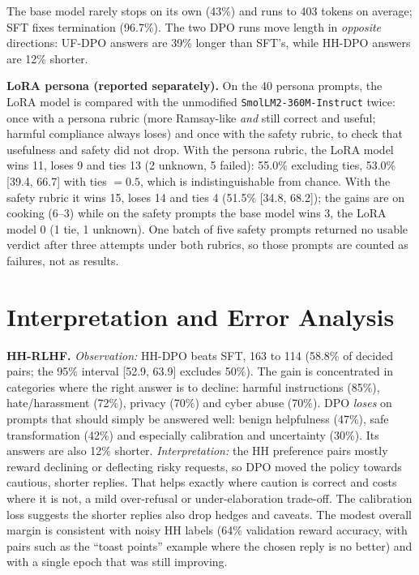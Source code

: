 \documentclass[10pt]{article}
\begin{document}
The base model rarely stops on its own (43\%) and runs to 403 tokens on average; SFT fixes
termination (96.7\%). The two DPO runs move length in \emph{opposite} directions: UF-DPO answers are
39\% longer than SFT's, while HH-DPO answers are 12\% shorter.

\textbf{LoRA persona (reported separately).} On the 40 persona prompts, the LoRA model is compared
with the unmodified \texttt{SmolLM2-360M-Instruct} twice: once with a persona rubric (more
Ramsay-like \emph{and} still correct and useful; harmful compliance always loses) and once with the
safety rubric, to check that usefulness and safety did not drop.
With the persona rubric, the LoRA model wins 11, loses 9 and ties 13 (2 unknown, 5 failed):
55.0\% excluding ties, 53.0\% [39.4, 66.7] with ties $=0.5$, which is indistinguishable from chance.
With the safety rubric it wins 15, loses 14 and ties 4 (51.5\% [34.8, 68.2]); the gains are on
cooking (6--3) while on the safety prompts the base model wins 3, the LoRA model 0 (1 tie,
1 unknown). One batch of five safety prompts returned no usable verdict after three attempts under both
rubrics, so those prompts are counted as failures, not as results.

\section{Interpretation and Error Analysis}
\textbf{HH-RLHF.} \emph{Observation:} HH-DPO beats SFT, 163 to 114 (58.8\% of decided pairs; the
95\% interval [52.9, 63.9] excludes 50\%). The gain is concentrated in categories where the right
answer is to decline: harmful instructions (85\%), hate/harassment (72\%), privacy (70\%) and cyber
abuse (70\%). DPO \emph{loses} on prompts that should simply be answered well: benign helpfulness
(47\%), safe transformation (42\%) and especially calibration and uncertainty (30\%). Its answers
are also 12\% shorter. \emph{Interpretation:} the HH preference pairs mostly reward declining or
deflecting risky requests, so DPO moved the policy towards cautious, shorter replies. That helps
exactly where caution is correct and costs where it is not, a mild over-refusal or
under-elaboration trade-off. The calibration loss suggests the shorter replies also drop hedges and
caveats. The modest overall margin is consistent with noisy HH labels (64\% validation reward
accuracy, with pairs such as the ``toast points'' example where the chosen reply is no better) and
with a single epoch that was still improving.
\end{document}
